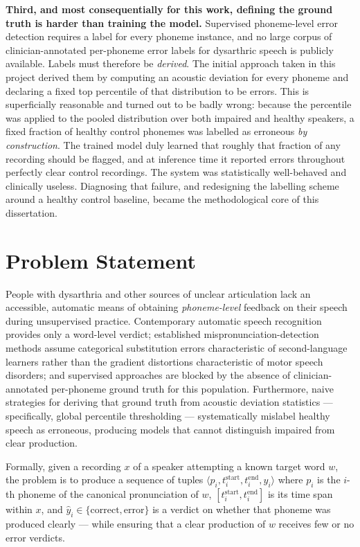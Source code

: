 \textbf{Third, and most consequentially for this work, defining the ground
truth is harder than training the model.} Supervised phoneme-level error
detection requires a label for every phoneme instance, and no large corpus of
clinician-annotated per-phoneme error labels for dysarthric speech is publicly
available. Labels must therefore be \emph{derived}. The initial approach taken
in this project derived them by computing an acoustic deviation for every
phoneme and declaring a fixed top percentile of that distribution to be errors.
This is superficially reasonable and turned out to be badly wrong: because the
percentile was applied to the pooled distribution over both impaired and
healthy speakers, a fixed fraction of healthy control phonemes was labelled as
erroneous \emph{by construction}. The trained model duly learned that roughly
that fraction of any recording should be flagged, and at inference time it
reported errors throughout perfectly clear control recordings. The system was
statistically well-behaved and clinically useless. Diagnosing that failure, and
redesigning the labelling scheme around a healthy control baseline, became the
methodological core of this dissertation.

\section{Problem Statement}
\label{sec:problem}

People with dysarthria and other sources of unclear articulation lack an
accessible, automatic means of obtaining \emph{phoneme-level} feedback on their
speech during unsupervised practice. Contemporary automatic speech recognition
provides only a word-level verdict; established mispronunciation-detection
methods assume categorical substitution errors characteristic of second-language
learners rather than the gradient distortions characteristic of motor speech
disorders; and supervised approaches are blocked by the absence of
clinician-annotated per-phoneme ground truth for this population. Furthermore,
naive strategies for deriving that ground truth from acoustic deviation
statistics --- specifically, global percentile thresholding --- systematically
mislabel healthy speech as erroneous, producing models that cannot distinguish
impaired from clear production.

Formally, given a recording $x$ of a speaker attempting a known target word $w$,
the problem is to produce a sequence of tuples
$\langle p_i, t^{\text{start}}_i, t^{\text{end}}_i, \hat{y}_i \rangle$ where
$p_i$ is the $i$-th phoneme of the canonical pronunciation of $w$,
$[t^{\text{start}}_i, t^{\text{end}}_i]$ is its time span within $x$, and
$\hat{y}_i \in \{\text{correct}, \text{error}\}$ is a verdict on whether that
phoneme was produced clearly --- while ensuring that a clear production of $w$
receives few or no error verdicts.

